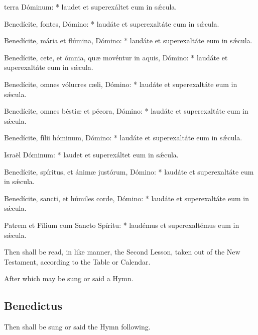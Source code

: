 { terra Dóminum: * laudet et superexáltet eum in sǽcula.\par
{}
Benedícite, fontes, Dómino: * laudáte et superexaltáte eum in sǽcula.\par
Benedícite, mária et flúmina, Dómino: * laudáte et superexaltáte eum in sǽcula.\par
Benedícite, cete, et ómnia, qu{\ae} movéntur in aquis, Dómino: * laudáte et superexaltáte eum in sǽcula.\par
Benedícite, omnes vólucres c{\ae}li, Dómino: * laudáte et superexaltáte eum in sǽcula.\par
Benedícite, omnes bésti{\ae} et pécora, Dómino: * laudáte et superexaltáte eum in sǽcula.\par
Benedícite, fílii hóminum, Dómino: * laudáte et superexaltáte eum in sǽcula.\par
{} Israël Dóminum: * laudet et superexáltet eum in sǽcula.\par
{}
Benedícite, spíritus, et ánim{\ae} justórum, Dómino: * laudáte et superexaltáte eum in sǽcula.\par
Benedícite, sancti, et húmiles corde, Dómino: * laudáte et superexaltáte eum in sǽcula.\par
{} Patrem et Fílium cum Sancto Spíritu: * laudémus et superexaltémus eum in sǽcula.}

\begin{rubric}
    {Then shall be read, in like manner, the Second Lesson, taken out of the New Testament, according to the Table or Calendar.}
\end{rubric}
\begin{rubric}
	After which may be sung or said a Hymn.
\end{rubric}

\clearpage
\subsection{Benedictus}\label{Benedictus}

\begin{rubric}
     Then shall be sung or said the Hymn following.%
\end{rubric}


